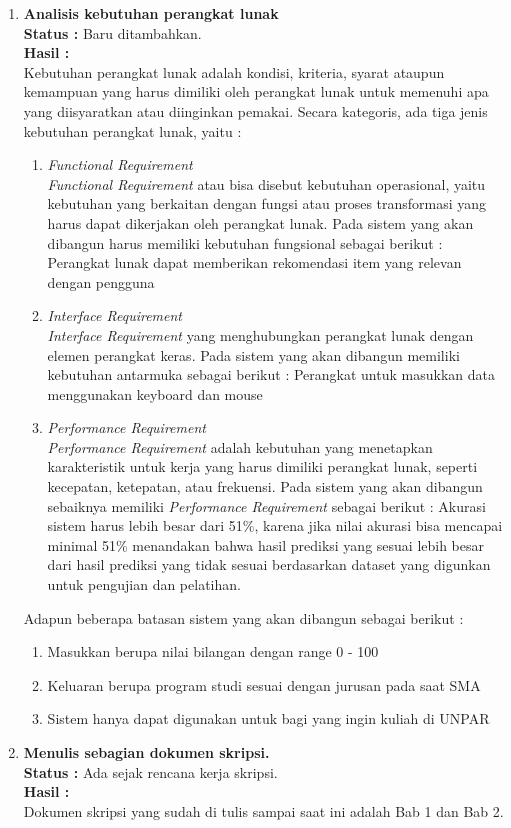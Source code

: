\documentclass[a4paper,twoside]{article}
\begin{document}
\begin{enumerate}
		\item \textbf{Analisis kebutuhan perangkat lunak}\\
		{\bf Status :} Baru ditambahkan.\\
		{\bf Hasil :} \\
			Kebutuhan perangkat lunak adalah kondisi, kriteria, syarat ataupun kemampuan yang harus dimiliki oleh perangkat lunak untuk memenuhi apa yang diisyaratkan atau diinginkan pemakai. Secara kategoris, ada tiga jenis kebutuhan perangkat lunak, yaitu : 
			\begin{enumerate}
				\item \textit{Functional Requirement}\\
				\textit{Functional Requirement} atau bisa disebut kebutuhan operasional, yaitu kebutuhan yang berkaitan dengan fungsi atau proses transformasi yang harus dapat dikerjakan oleh perangkat lunak. Pada sistem yang akan dibangun harus memiliki kebutuhan fungsional sebagai berikut : Perangkat lunak dapat memberikan rekomendasi item yang relevan dengan pengguna
				
				\item \textit{Interface Requirement}\\
				\textit{Interface Requirement} yang menghubungkan perangkat lunak dengan elemen perangkat keras. Pada sistem yang akan dibangun memiliki kebutuhan antarmuka sebagai berikut : Perangkat untuk masukkan data menggunakan keyboard dan mouse
				
				\item \textit{Performance Requirement}\\
				\textit{Performance Requirement} adalah kebutuhan yang menetapkan karakteristik untuk kerja yang harus dimiliki perangkat lunak, seperti kecepatan, ketepatan, atau frekuensi. Pada sistem yang akan dibangun sebaiknya memiliki \textit{Performance Requirement} sebagai berikut : Akurasi sistem harus lebih besar dari 51\%, karena jika nilai akurasi bisa mencapai minimal 51\% menandakan bahwa hasil prediksi yang sesuai lebih besar dari hasil prediksi yang tidak sesuai berdasarkan dataset yang digunkan untuk pengujian dan pelatihan.
				
			\end{enumerate}
			
			Adapun beberapa batasan sistem yang akan dibangun sebagai berikut :
			\begin{enumerate}
				\item Masukkan berupa nilai bilangan dengan range 0 - 100
				\item Keluaran berupa program studi sesuai dengan jurusan pada saat SMA
				\item Sistem hanya dapat digunakan untuk bagi yang ingin kuliah di UNPAR
			\end{enumerate}
		
		\item \textbf{Menulis sebagian dokumen skripsi.}\\
		{\bf Status :} Ada sejak rencana kerja skripsi.\\
		{\bf Hasil :} \\
		Dokumen skripsi yang sudah di tulis sampai saat ini adalah Bab 1 dan Bab 2.
	\end{enumerate}
\end{document}
